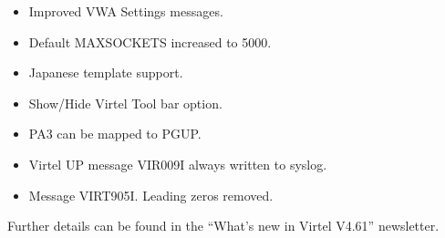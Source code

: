 \documentclass[letterpaper,10pt,english]{sphinxmanual}
\begin{document}
\begin{itemize}
\item {} 
Improved VWA Settings messages.

\item {} 
Default MAXSOCKETS increased to 5000.

\item {} 
Japanese template support.

\item {} 
Show/Hide Virtel Tool bar option.

\item {} 
PA3 can be mapped to PGUP.

\item {} 
Virtel UP message VIR009I always written to syslog.

\item {} 
Message VIRT905I. Leading zeros removed.

\end{itemize}

Further details can be found in the “What’s new in Virtel V4.61” newsletter.



\renewcommand{\indexname}{Index}
\printindex
\end{document}
